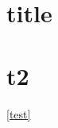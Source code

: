 \documentclass{book}
\begin{document}
   
	\section{title}
	\label{test}
	\section{t2}
	\autoref{test}
	
	
\printbibliography


%
\end{document}
